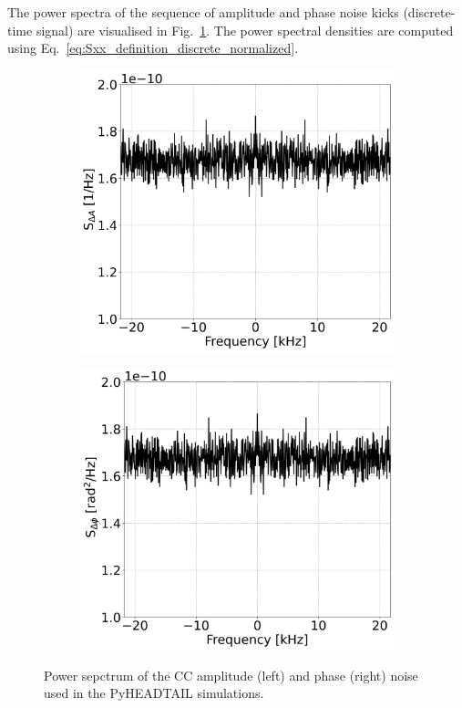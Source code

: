 The power spectra of the sequence of amplitude and phase noise kicks (discrete-time signal) are visualised in Fig.~\ref{fig:psd_cc_simulations_example}. The power spectral densities are computed using Eq.~\eqref{eq:Sxx_definition_discrete_normalized}.

\begin{figure}[htp]
    \centering
    \begin{subfigure}{.45\textwidth}
        \centering
        \includegraphics[width=.95\linewidth]{images/Ch6/psd_amplitude_noise_example.png}  
    \end{subfigure}
    \begin{subfigure}{.45\textwidth}
        \centering
        \includegraphics[width=.95\linewidth]{images/Ch6/psd_phase_noise_example.png}
    \end{subfigure}
    \caption{Power sepctrum of the CC amplitude (left) and phase (right) noise used in the PyHEADTAIL simulations.}
    \label{fig:psd_cc_simulations_example}
\end{figure}

